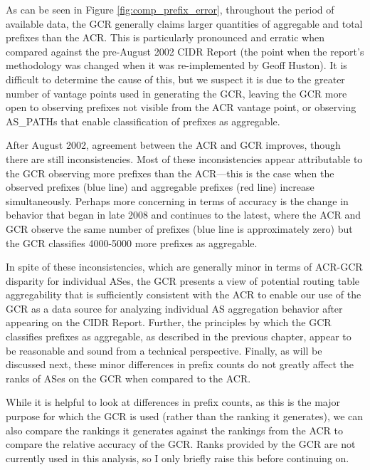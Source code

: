 As can be seen in Figure \ref{fig:comp_prefix_error}, throughout the period of
available data, the GCR generally claims larger quantities of aggregable and
total prefixes than the ACR. This is particularly pronounced and erratic when
compared against the pre-August 2002 CIDR Report (the point when the report's
methodology was changed when it was re-implemented by Geoff Huston). It is
difficult to determine the cause of this, but we suspect it is due to the
greater number of vantage points used in generating the GCR, leaving the GCR
more open to observing prefixes not visible from the ACR vantage point, or
observing AS\_PATHs that enable classification of prefixes as aggregable.

After August 2002, agreement between the ACR and GCR improves, though there are
still inconsistencies. Most of these inconsistencies appear attributable to
the GCR observing more prefixes than the ACR---this is the case when the
observed prefixes (blue line) and aggregable prefixes (red line) increase
simultaneously. Perhaps more concerning in terms of accuracy is the change in
behavior that began in late 2008 and continues to the latest, where the ACR and
GCR observe the same number of prefixes (blue line is approximately zero) but
the GCR classifies 4000-5000 more prefixes as aggregable.

In spite of these inconsistencies, which are generally minor in terms of
ACR-GCR disparity for individual ASes, the GCR presents a view of potential
routing table aggregability that is sufficiently consistent with the ACR to
enable our use of the GCR as a data source for analyzing individual AS
aggregation behavior after appearing on the CIDR Report. Further, the
principles by which the GCR classifies prefixes as aggregable, as described in
the previous chapter, appear to be reasonable and sound from a technical
perspective. Finally, as will be discussed next, these minor differences in
prefix counts do not greatly affect the ranks of ASes on the GCR when compared
to the ACR.

While it is helpful to look at differences in prefix counts, as this is the
major purpose for which the GCR is used (rather than the ranking it generates),
we can also compare the rankings it generates against the rankings from the ACR
to compare the relative accuracy of the GCR. Ranks provided by the GCR are not
currently used in this analysis, so I only briefly raise this before continuing
on.

